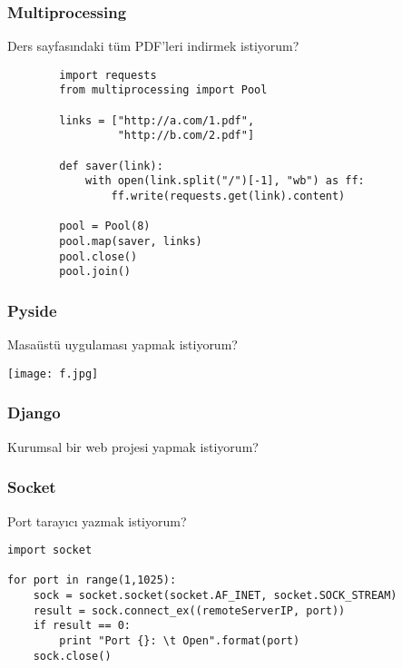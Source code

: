 \documentclass[10pt, compress]{beamer}
\begin{document}
\begin{frame}[fragile]
    \frametitle{Multiprocessing}
    \begin{center}
        Ders sayfasındaki tüm PDF'leri indirmek istiyorum?
    \end{center}  
      \begin{verbatim}
        import requests
        from multiprocessing import Pool
        
        links = ["http://a.com/1.pdf", 
                 "http://b.com/2.pdf"]
        
        def saver(link):
            with open(link.split("/")[-1], "wb") as ff:
                ff.write(requests.get(link).content)
        
        pool = Pool(8)
        pool.map(saver, links)
        pool.close()
        pool.join()

      \end{verbatim}
\end{frame}

\begin{frame}[fragile]
    \frametitle{Pyside}
    \begin{center}
        Masaüstü uygulaması yapmak istiyorum?

    \end{center}  
    \texttt{[image: f.jpg]}    
\end{frame}

\begin{frame}[fragile]
    \frametitle{Django}
    \begin{center}
        Kurumsal bir web projesi yapmak istiyorum?
    \end{center}  
\end{frame}



\begin{frame}[fragile]
    \frametitle{Socket}
    \begin{center}
        Port tarayıcı yazmak istiyorum?
      
      \begin{verbatim}
import socket

for port in range(1,1025):  
    sock = socket.socket(socket.AF_INET, socket.SOCK_STREAM)
    result = sock.connect_ex((remoteServerIP, port))
    if result == 0:
        print "Port {}: \t Open".format(port)
    sock.close()
      \end{verbatim}
      \end{center}
\end{frame}
\end{document}

